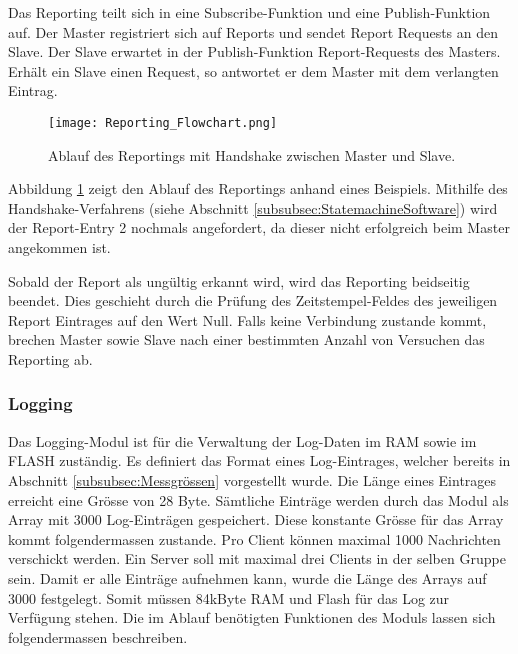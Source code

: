 Das Reporting teilt sich in eine Subscribe-Funktion und eine Publish-Funktion auf.
Der Master registriert sich auf Reports und sendet Report Requests an den Slave.
Der Slave erwartet in der Publish-Funktion Report-Requests des Masters.
Erhält ein Slave einen Request, so antwortet er dem Master mit dem verlangten Eintrag.

\begin{figure}[H]
	\centering
	\texttt{[image: Reporting\_Flowchart.png]}
	\caption{Ablauf des Reportings mit Handshake zwischen Master und Slave.}\label{fig:ReportingAblauf}
\end{figure}

Abbildung \ref{fig:ReportingAblauf} zeigt den Ablauf des Reportings anhand eines Beispiels.
Mithilfe des Handshake-Verfahrens (siehe Abschnitt \ref{subsubsec:StatemachineSoftware}) wird der Report-Entry 2 nochmals angefordert, da dieser nicht erfolgreich beim Master angekommen ist.

Sobald der Report als ungültig erkannt wird, wird das Reporting beidseitig beendet.
Dies geschieht durch die Prüfung des Zeitstempel-Feldes des jeweiligen Report Eintrages auf den Wert Null.
Falls keine Verbindung zustande kommt, brechen Master sowie Slave nach einer bestimmten Anzahl von Versuchen das Reporting ab.


\subsubsection{Logging}\label{subsubsec:Logging}
Das Logging-Modul ist für die Verwaltung der Log-Daten im RAM sowie im FLASH zuständig.
Es definiert das Format eines Log-Eintrages, welcher bereits in Abschnitt \ref{subsubsec:Messgrössen} vorgestellt wurde.
Die Länge eines Eintrages erreicht eine Grösse von 28 Byte.
Sämtliche Einträge werden durch das Modul als Array mit 3000 Log-Einträgen gespeichert.
Diese konstante Grösse für das Array kommt folgendermassen zustande.
Pro Client können maximal 1000 Nachrichten verschickt werden.
Ein Server soll mit maximal drei Clients in der selben Gruppe sein.
Damit er alle Einträge aufnehmen kann, wurde die Länge des Arrays auf 3000 festgelegt.
Somit müssen 84kByte RAM und Flash für das Log zur Verfügung stehen. Die im Ablauf benötigten Funktionen des Moduls lassen sich folgendermassen beschreiben. 

